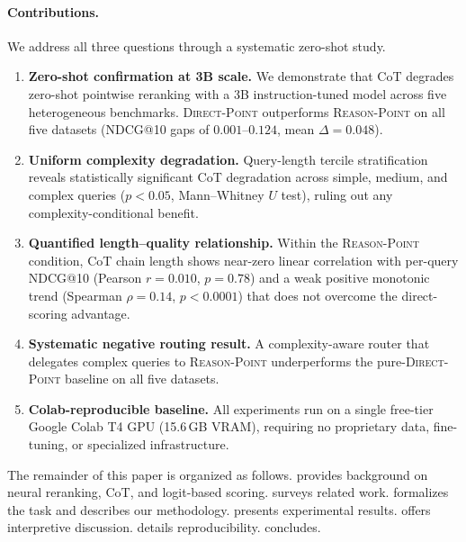 \documentclass[12pt]{article}
\makeatletter
\newcommand{\ndcg}{NDCG@10}
\newcommand{\direct}{\textsc{Direct-Point}}
\newcommand{\reason}{\textsc{Reason-Point}}
\newcommand{\CoT}{CoT}
\makeatother
\begin{document}
\paragraph{Contributions.}
We address all three questions through a systematic zero-shot study.

\begin{enumerate}[leftmargin=2em, label=\textbf{C\arabic*.}]
  \item \textbf{Zero-shot confirmation at 3B scale.}  We demonstrate that
        \CoT{} degrades zero-shot pointwise reranking with a 3B
        instruction-tuned model across five heterogeneous benchmarks.
        \direct{} outperforms \reason{} on all five datasets (\ndcg{} gaps
        of $0.001$--$0.124$, mean $\Delta=0.048$).

  \item \textbf{Uniform complexity degradation.}  Query-length tercile
        stratification reveals statistically significant \CoT{} degradation
        across simple, medium, and complex queries ($p<0.05$, Mann--Whitney
        $U$ test), ruling out any complexity-conditional benefit.

  \item \textbf{Quantified length--quality relationship.}  Within the
        \reason{} condition, CoT chain length shows near-zero linear
        correlation with per-query \ndcg{} (Pearson $r=0.010$, $p=0.78$)
        and a weak positive monotonic trend (Spearman $\rho=0.14$,
        $p<0.0001$) that does not overcome the direct-scoring advantage.

  \item \textbf{Systematic negative routing result.}  A complexity-aware
        router that delegates complex queries to \reason{} underperforms the
        pure-\direct{} baseline on all five datasets.

  \item \textbf{Colab-reproducible baseline.}  All experiments run on a
        single free-tier Google Colab T4 GPU (15.6\,GB VRAM), requiring no
        proprietary data, fine-tuning, or specialized infrastructure.
\end{enumerate}

The remainder of this paper is organized as follows.
 provides background on neural reranking, \CoT{}, and
logit-based scoring.   surveys related work.
 formalizes the task and describes our methodology.
 presents experimental results.  
offers interpretive discussion.   details reproducibility.
 concludes.
\end{document}
